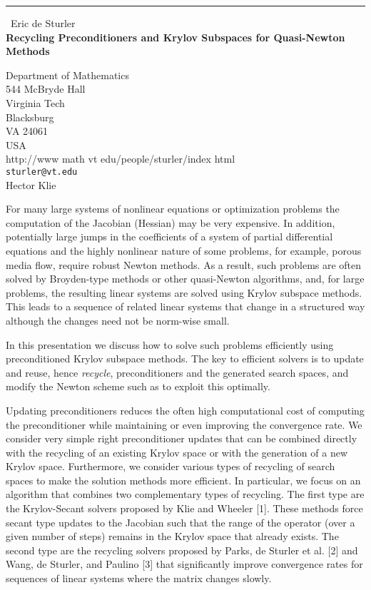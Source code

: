 \documentclass{report}
\begin{document}
\begin{center}
\rule{6in}{1pt} \
{\large Eric de Sturler \\
{\bf Recycling Preconditioners and Krylov Subspaces for Quasi-Newton Methods}}

Department of Mathematics \\ 544 McBryde Hall \\ Virginia Tech \\ Blacksburg \\ VA 24061 \\ USA \\ http://www math vt edu/people/sturler/index html
\\
{\tt sturler@vt.edu}\\
Hector Klie\end{center}

For many large systems of nonlinear equations or optimization problems
the computation of the Jacobian (Hessian) may be very expensive. In
addition, potentially large jumps in the coefficients of a system of
partial differential equations and the highly nonlinear nature of some
problems, for example, porous media flow, require robust Newton methods.
As a result, such problems are often solved by Broyden-type methods or
other quasi-Newton algorithms, and, for large problems, the resulting
linear systems are solved using Krylov subspace methods. This leads to a
sequence of related linear systems that change in a structured way
although the changes need not be norm-wise small.

In this presentation we discuss how to solve such problems efficiently
using preconditioned Krylov subspace methods. The key to efficient
solvers is to update and reuse, hence {\em recycle}, preconditioners and
the generated search spaces, and modify the Newton scheme such as to
exploit this optimally.

Updating preconditioners reduces the often high computational cost of
computing the preconditioner while maintaining or even improving the
convergence rate.
We consider very simple right preconditioner updates that can be combined
directly with the recycling of an existing Krylov space or with the
generation of a new Krylov space. Furthermore, we consider various types
of recycling of search spaces to make the solution methods more
efficient. In particular, we focus on an algorithm that combines two
complementary types of recycling. The first type are the Krylov-Secant
solvers proposed by Klie and Wheeler [1]. These methods force secant type
updates to the
Jacobian such that the range of the operator (over a given number of
steps) remains in the Krylov space that already exists. The second type
are the recycling solvers proposed by Parks, de Sturler et al. [2] and
Wang, de Sturler, and Paulino [3] that significantly improve convergence
rates for sequences of linear systems where the matrix changes slowly.
\end{document}
